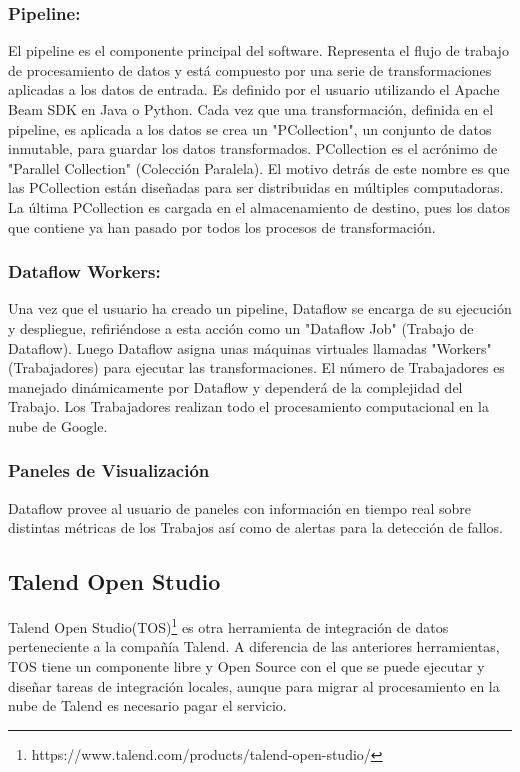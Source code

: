 \subsubsection{Pipeline:}

El pipeline es el componente principal del software. Representa el flujo de trabajo de procesamiento de datos y est\'a 
compuesto por una serie de transformaciones aplicadas a los datos de entrada. Es definido por el usuario utilizando el 
Apache Beam SDK en Java o Python. Cada vez que una transformación, definida en el pipeline, es aplicada a los datos se crea 
un "PCollection", un conjunto de datos inmutable, para guardar los datos transformados. PCollection es el acrónimo de 
"Parallel Collection" (Colección 
Paralela). El motivo detrás de este nombre es que las PCollection están diseñadas para ser distribuidas en múltiples 
computadoras. La \'ultima PCollection es cargada en el almacenamiento de destino, pues los datos que contiene ya han pasado 
por todos los procesos de transformación. 

\subsubsection{Dataflow Workers:}

Una vez que el usuario ha creado un pipeline, Dataflow se encarga de su ejecución y despliegue, refiriéndose a esta 
acción como un "Dataflow Job" (Trabajo de Dataflow). Luego Dataflow asigna unas máquinas virtuales llamadas "Workers" 
(Trabajadores) para ejecutar las transformaciones. El n\'umero de Trabajadores es manejado din\'amicamente por Dataflow 
y depender\'a de la complejidad del Trabajo. Los Trabajadores realizan todo el procesamiento computacional en la nube 
de Google.

\subsubsection{Paneles de Visualizaci\'on}

Dataflow provee al usuario de paneles con información en tiempo real sobre distintas métricas de los Trabajos as\'i 
como de alertas para la detección de fallos.





\subsection{Talend Open Studio}

Talend Open Studio(TOS)\footnote{https://www.talend.com/products/talend-open-studio/} es otra herramienta de 
integración de datos perteneciente a la compañía Talend. A diferencia de las 
anteriores herramientas, TOS tiene un componente libre y Open Source con el que se puede ejecutar y diseñar tareas de 
integración locales, aunque para migrar al procesamiento en la nube de Talend es necesario pagar el servicio. 

